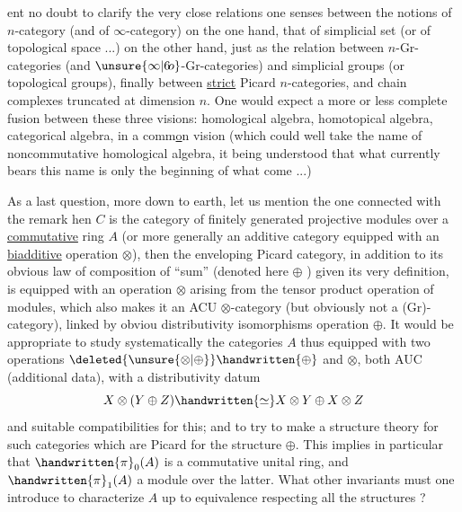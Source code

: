 
ent no doubt to clarify the very close relations one senses between the notions of $n$-category (and of $\infty$-category) on the one hand, that of simplicial set (or of topological space ...) on the other hand, just as the relation between $n$-Gr-categories (and $\unsure{\infty|6\!o}$-Gr-categories) and simplicial groups (or topological groups), finally between   \uline{strict} Picard $n$-categories, and  chain complexes truncated at dimension $n$. One would expect a more or less complete fusion between these three visions: homological algebra, homotopical algebra, categorical algebra, in a comm\uline{o}n vision (which could well take the name of noncommutative homological algebra, it being understood that what currently bears this name is only the beginning of what   come ...)

As a last question, more down to earth, let us mention the one connected with the remark   hen  $C$ is the category of finitely generated projective modules over a \uline{commutative} ring $A$ (or more generally an additive category equipped with an   \uline{biadditive} operation $\otimes$), then the enveloping Picard category, in addition to its obvious law of composition of ``sum'' (denoted here $\oplus$ ) given   its very definition, is equipped with an operation $\otimes$ arising from the  tensor product operation of  modules, which also makes it an ACU $\otimes$-category (but obviously not a (Gr)-category), linked by obviou distributivity isomorphisms   operation $\oplus$. It would be appropriate to study systematically the categories $A$ thus equipped with two operations $\deleted{\unsure{\otimes|\oplus}}\handwritten{\oplus}$ and $\otimes$, both AUC (additional data), with a distributivity datum
\[
X\otimes(Y\oplus Z)\handwritten{\simeq}X\otimes Y\oplus X\otimes Z
\]
and suitable compatibilities for this; and to try to make a structure theory for such categories which are  Picard for the structure $\oplus$. This implies in particular that $\handwritten{\pi}_{0}(A)$ is a commutative unital ring, and $\handwritten{\pi}_{1}(A)$ a module over the latter. What other invariants must one introduce to characterize $A$ up to equivalence respecting all the structures ?

